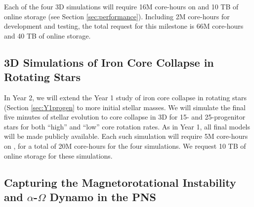 Each of the four 3D simulations will require 16M core-hours on \mira and 10 TB of online storage (see Section \ref{sec:performance}).
Including 2M \mira core-hours for development and testing, the total request for this milestone is 66M \mira core-hours and 40 TB of online storage.



\subsection{3D Simulations of Iron Core Collapse in Rotating Stars}
\label{sec:Y2progen}

In Year 2, we will extend the Year 1 study of iron core collapse in rotating stars (Section \ref{sec:Y1progen} to more initial stellar masses.
We will simulate the final five minutes of stellar evolution to core collapse in 3D for 15- and 25-\msun progenitor stars for both ``high'' and ``low'' core rotation rates.
As in Year 1, all final models will be made publicly available.
Each such simulation will require 5M core-hours on \mira, for a total of 20M core-hours for the four simulations.
We request 10 TB of online storage for these simulations.

\subsection{Capturing the Magnetorotational Instability and $\alpha$-$\Omega$ Dynamo in the PNS}

